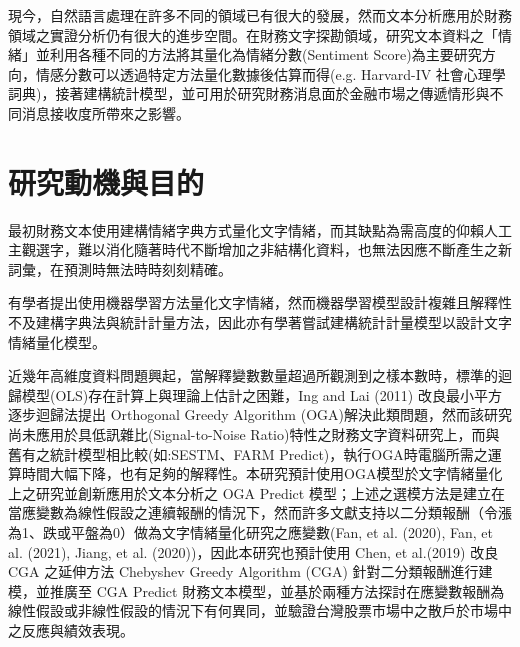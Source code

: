 現今，自然語言處理在許多不同的領域已有很大的發展，然而文本分析應用於財務領域之實證分析仍有很大的進步空間。在財務文字探勘領域，研究文本資料之「情緒」並利用各種不同的方法將其量化為情緒分數(Sentiment Score)為主要研究方向，情感分數可以透過特定方法量化數據後估算而得(e.g. Harvard-IV 社會心理學詞典)，接著建構統計模型，並可用於研究財務消息面於金融市場之傳遞情形與不同消息接收度所帶來之影響。

\newpage

\section{研究動機與目的}
最初財務文本使用建構情緒字典方式量化文字情緒，而其缺點為需高度的仰賴人工主觀選字，難以消化隨著時代不斷增加之非結構化資料，也無法因應不斷產生之新詞彙，在預測時無法時時刻刻精確。

有學者提出使用機器學習方法量化文字情緒，然而機器學習模型設計複雜且解釋性不及建構字典法與統計計量方法，因此亦有學著嘗試建構統計計量模型以設計文字情緒量化模型。

近幾年高維度資料問題興起，當解釋變數數量超過所觀測到之樣本數時，標準的迴歸模型(OLS)存在計算上與理論上估計之困難，Ing and Lai (2011) 改良最小平方逐步迴歸法提出 Orthogonal Greedy Algorithm (OGA)解決此類問題，然而該研究尚未應用於具低訊雜比(Signal-to-Noise Ratio)特性之財務文字資料研究上，而與舊有之統計模型相比較(如:SESTM、FARM Predict)，執行OGA時電腦所需之運算時間大幅下降，也有足夠的解釋性。本研究預計使用OGA模型於文字情緒量化上之研究並創新應用於文本分析之 OGA Predict 模型；上述之選模方法是建立在當應變數為線性假設之連續報酬的情況下，然而許多文獻支持以二分類報酬（令漲為1、跌或平盤為0）做為文字情緒量化研究之應變數(Fan, et al. (2020), Fan, et al. (2021), Jiang, et al. (2020))，因此本研究也預計使用 Chen, et al.(2019) 改良 CGA 之延伸方法 Chebyshev Greedy Algorithm (CGA) 針對二分類報酬進行建模，並推廣至 CGA Predict 財務文本模型，並基於兩種方法探討在應變數報酬為線性假設或非線性假設的情況下有何異同，並驗證台灣股票市場中之散戶於市場中之反應與績效表現。
